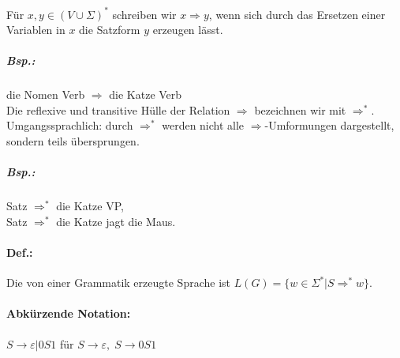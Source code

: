 \documentclass{scrreprt}
\begin{document}
Für $x,y\in (V \cup \Sigma)^*$ schreiben wir $x \Rightarrow y$, wenn sich durch das Ersetzen einer Variablen in $x$ die Satzform $y$ erzeugen lässt.
\subparagraph{Bsp.:} die Nomen Verb $\Rightarrow$ die Katze Verb\medskip\\
Die reflexive und transitive Hülle der Relation $\Rightarrow$ bezeichnen wir mit $\Rightarrow^*$. Umgangssprachlich: durch $\Rightarrow^*$ werden nicht alle $\Rightarrow$-Umformungen dargestellt, sondern teils übersprungen.
\subparagraph{Bsp.:} \parskp
Satz $\Rightarrow^*$ die Katze VP, \\
Satz $\Rightarrow^*$ die Katze jagt die Maus.
\paragraph{Def.:} Die von einer Grammatik erzeugte Sprache ist $L(G)=\{w\in \Sigma^* | S \Rightarrow^* w\}$.
\paragraph{Abkürzende Notation:} \parskp
$S\to \varepsilon | 0S1$ für $S\to \varepsilon, \; S \to 0S1$
\end{document}
